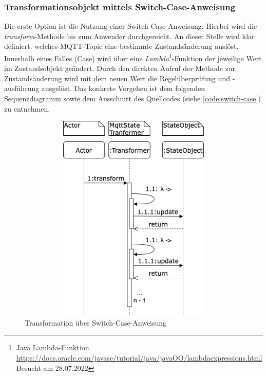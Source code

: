     \subsubsection*{Transformationsobjekt mittels Switch-Case-Anweisung}
    Die erste Option ist die Nutzung einer Switch-Case-Anweisung. Hierbei wird die \textit{transform}-Methode bis zum Anwender durchgereicht. An dieser Stelle 
    wird klar definiert, welches \acs{MQTT}-Topic eine bestimmte Zustandsänderung auslöst. Innerhalb eines Falles (Case) wird über eine 
    \textit{Lambda}\footnote{Java Lambda-Funktion. \url{https://docs.oracle.com/javase/tutorial/java/javaOO/lambdaexpressions.html} Besucht am 28.07.2022}-Funktion 
    der jeweilige Wert im Zustandsobjekt geändert. Durch den direkten Aufruf der Methode zur Zustandsänderung wird mit dem neuen Wert die Regelüberprüfung und -ausführung 
    ausgelöst. Das konkrete Vorgehen ist dem folgenden Sequenzdiagramm sowie dem Ausschnitt des Quellcodes (siehe \ref{code:switch-case}) zu entnehmen.
    \pagebreak
    \begin{figure}[hbt!]
        \centering
        \includegraphics[width=14cm,height=10cm,keepaspectratio]{images/Transformation_old.png}
        \caption{Transformation über Switch-Case-Anweisung}
        \label{fig:sequenceTransformationOld}
    \end{figure}

